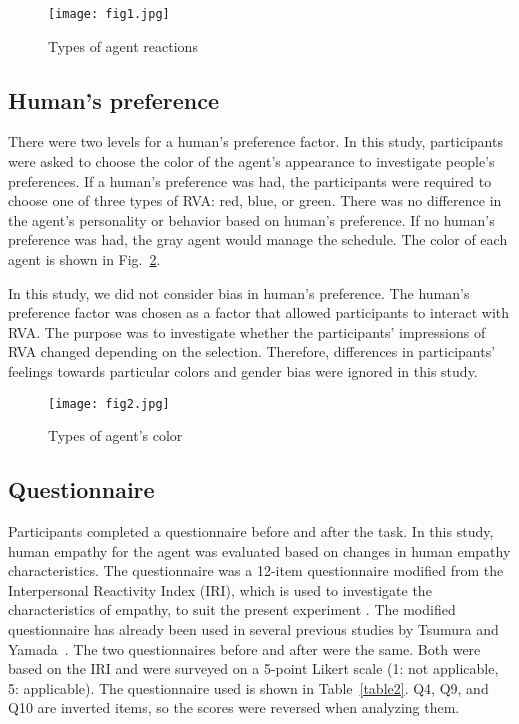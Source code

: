 \documentclass[runningheads]{llncs}
\begin{document}
\begin{figure}[tbp]
		\begin{center}
		\texttt{[image: fig1.jpg]}
		\caption{Types of agent reactions}
		\label{reaction}
	\end{center}
\end{figure}

\subsection{Human's preference} 
There were two levels for a human's preference factor. 
In this study, participants were asked to choose the color of the agent's appearance to investigate people's preferences.
If a human's preference was had, the participants were required to choose one of three types of RVA: red, blue, or green.
There was no difference in the agent's personality or behavior based on human's preference.
If no human's preference was had, the gray agent would manage the schedule. 
The color of each agent is shown in Fig.~\ref{color}. 

In this study, we did not consider bias in human's preference. 
The human's preference factor was chosen as a factor that allowed participants to interact with RVA. 
The purpose was to investigate whether the participants' impressions of RVA changed depending on the selection.
Therefore, differences in participants' feelings towards particular colors and gender bias were ignored in this study.

\begin{figure}[tbp]
		\begin{center}
		\texttt{[image: fig2.jpg]}
		\caption{Types of agent's color}
		\label{color}
	\end{center}
\end{figure}

\subsection{Questionnaire}
Participants completed a questionnaire before and after the task. 
In this study, human empathy for the agent was evaluated based on changes in human empathy characteristics.
The questionnaire was a 12-item questionnaire modified from the Interpersonal Reactivity Index (IRI), which is used to investigate the characteristics of empathy, to suit the present experiment \cite{Davis80}. 
The modified questionnaire has already been used in several previous studies by Tsumura and Yamada~\cite{Tsumura22,Tsumura23-1,Tsumura23-2}.
The two questionnaires before and after were the same. Both were based on the IRI and were surveyed on a 5-point Likert scale (1: not applicable, 5: applicable). 
The questionnaire used is shown in Table~\ref{table2}. Q4, Q9, and Q10 are inverted items, so the scores were reversed when analyzing them.
\end{document}
